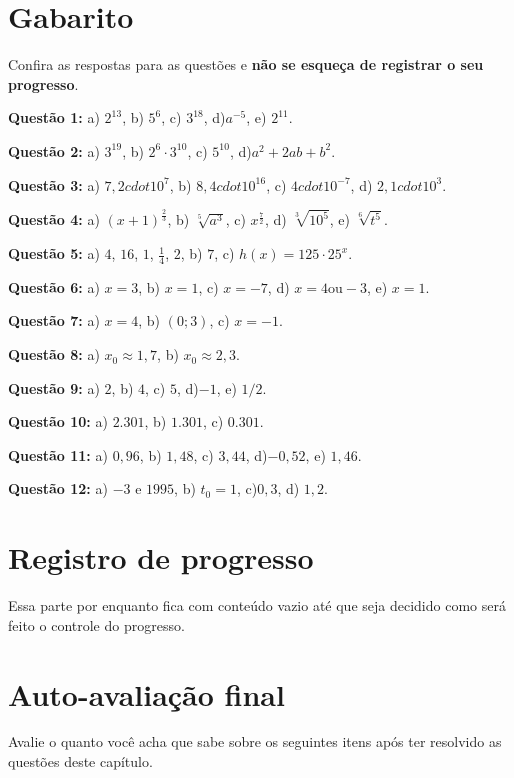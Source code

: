 \documentclass[main_estudante.tex]{subfiles}
\begin{document}
\newpage

\section{Gabarito}

Confira as respostas para as questões e \textbf{não se esqueça de registrar o seu progresso}.

\noindent\textbf{Questão 1:} a) $2^{13}$, b) $5^6$, c) $3^{18}$, d)$a^{-5}$, e) $2^{11}$.

\noindent\textbf{Questão 2:} a) $3^{19}$, b) $2^6 \cdot 3^{10}$, c) $5^{10}$, d)$a^2+2ab+b^2$.

\noindent\textbf{Questão 3:} a) $7,2 cdot 10^{7}$, b) $8,4 cdot 10^{16}$, c) $4 cdot 10^{-7}$, d) $2,1 cdot 10^{3}$.

\noindent\textbf{Questão 4:} a) $(x+1)^{\frac{2}{3}}$, b) $\sqrt[5]{a^3}$, c) $x^{\frac{7}{2}}$, d) $\sqrt[3]{10^5}$, e) $\sqrt[6]{t^5}$.

\noindent\textbf{Questão 5:} a) $4$, $16$, $1$, $\frac{1}{4}$, $2$, b) $7$, c) $h(x)=125 \cdot 25^x$.

\noindent\textbf{Questão 6:} a) $x=3$, b) $x=1$, c) $x=-7$, d) $x=4 \text{ou} -3$, e) $x=1$.

\noindent\textbf{Questão 7:} a) $x=4$, b) $(0;3)$, c) $x=-1$.

\noindent\textbf{Questão 8:} a) $x_0 \approx 1,7$, b) $x_0 \approx 2,3$.

\noindent\textbf{Questão 9:} a) $2$, b) $4$, c) $5$, d)$-1$, e) $1/2$.

\noindent\textbf{Questão 10:} a) $2.301$, b) $1.301$, c) $0.301$.

\noindent\textbf{Questão 11:} a) $0,96$, b) $1,48$, c) $3,44$, d)$-0,52$, e) $1,46$.

\noindent\textbf{Questão 12:} a) $-3$ e $1995$, b) $t_0=1$, c)$0,3$, d) $1,2$.

\section{Registro de progresso}

Essa parte por enquanto fica com conteúdo vazio até que seja decidido como será feito o controle do progresso.

\newpage

\section{Auto-avaliação final}
Avalie o quanto você acha que sabe sobre os seguintes itens após ter resolvido as questões deste capítulo.
\end{document}
